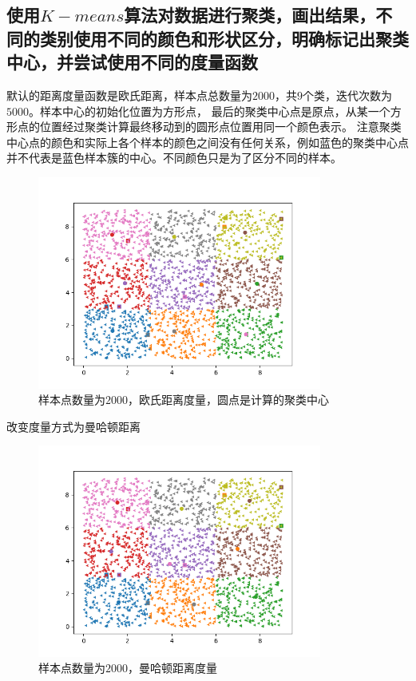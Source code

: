 \documentclass{article}
\begin{document}
\subsection*{\Large \textbf{使用$K-means$算法对数据进行聚类，画出结果，不同的类别使用不同的颜色和形状区分，明确标记出聚类中心，并尝试使用不同的度量函数}
}
默认的距离度量函数是欧氏距离，样本点总数量为$2000$，共$9$个类，迭代次数为$5000$。样本中心的初始化位置为方形点，
最后的聚类中心点是原点，从某一个方形点的位置经过聚类计算最终移动到的圆形点位置用同一个颜色表示。
注意聚类中心点的颜色和实际上各个样本的颜色之间没有任何关系，例如蓝色的聚类中心点并不代表是蓝色样本簇的中心。不同颜色只是为了区分不同的样本。
\begin{figure}[H]
    \centering
    \begin{minipage}[t]{1.0\linewidth}
        \centering
        \includegraphics[height=7cm]{Figure_1.png}
        \caption{样本点数量为$2000$，欧氏距离度量，圆点是计算的聚类中心}
    \end{minipage}
 \end{figure}
 改变度量方式为曼哈顿距离
 \begin{figure}[H]
    \centering
    \begin{minipage}[t]{1.0\linewidth}
        \centering
        \includegraphics[height=7cm]{Figure_2.png}
        \caption{样本点数量为$2000$，曼哈顿距离度量}
    \end{minipage}
 \end{figure}
\end{document}
